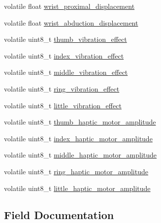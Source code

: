 \begin{DoxyCompactItemize}
\item 
volatile float \hyperlink{struct_maestro_glove_phalanges_a3dba2ad5e29c82bb998d5df69bd1aa4a}{wrist\+\_\+proximal\+\_\+displacement}
\item 
volatile float \hyperlink{struct_maestro_glove_phalanges_a0f5cd7360a0a5dfc4ed2c164e8758108}{wrist\+\_\+abduction\+\_\+displacement}
\item 
volatile uint8\+\_\+t \hyperlink{struct_maestro_glove_phalanges_abc5f24d03d6cbf46eb40a237d196d61e}{thumb\+\_\+vibration\+\_\+effect}
\item 
volatile uint8\+\_\+t \hyperlink{struct_maestro_glove_phalanges_a10b5d6212646eca8953c0aae842375d2}{index\+\_\+vibration\+\_\+effect}
\item 
volatile uint8\+\_\+t \hyperlink{struct_maestro_glove_phalanges_a3b6f00bc4208c3a9b46d8ea958e8a9b1}{middle\+\_\+vibration\+\_\+effect}
\item 
volatile uint8\+\_\+t \hyperlink{struct_maestro_glove_phalanges_aa6affc7c257dbbd37dc2ed1f0ec28efb}{ring\+\_\+vibration\+\_\+effect}
\item 
volatile uint8\+\_\+t \hyperlink{struct_maestro_glove_phalanges_a2010e9d7dc5d155f47c3232032b40a07}{little\+\_\+vibration\+\_\+effect}
\item 
volatile uint8\+\_\+t \hyperlink{struct_maestro_glove_phalanges_a8cc234bcd71e28632c6d815e92c4573a}{thumb\+\_\+haptic\+\_\+motor\+\_\+amplitude}
\item 
volatile uint8\+\_\+t \hyperlink{struct_maestro_glove_phalanges_a5373faa1f9bc2d0357ccea80f2353400}{index\+\_\+haptic\+\_\+motor\+\_\+amplitude}
\item 
volatile uint8\+\_\+t \hyperlink{struct_maestro_glove_phalanges_a2c0459c16b30fb1d10e7eb6c357d9325}{middle\+\_\+haptic\+\_\+motor\+\_\+amplitude}
\item 
volatile uint8\+\_\+t \hyperlink{struct_maestro_glove_phalanges_a77e88540c8e7cb5db279f4cce23006e4}{ring\+\_\+haptic\+\_\+motor\+\_\+amplitude}
\item 
volatile uint8\+\_\+t \hyperlink{struct_maestro_glove_phalanges_aa4f4a00f9647ffed2618335aaeff1b50}{little\+\_\+haptic\+\_\+motor\+\_\+amplitude}
\end{DoxyCompactItemize}


\subsection{Field Documentation}
\mbox{\label{struct_maestro_glove_phalanges_ab8360de608dab76b64bd827ad37b9ca3}} 
